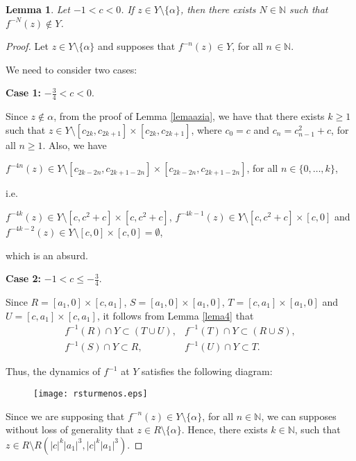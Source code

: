 \documentclass[11pt]{amsart}
\newtheorem{lemma}[theorem]{Lemma}
\theoremstyle{definition}
\begin{document}
\begin{lemma}
Let $-1< c<0$. If $z\in Y\setminus \{\alpha\}$, then there exists $N\in\mathbb{N}$ such that $f^{-N}(z)\not\in Y$. \label{propmula}
\end{lemma}
\begin{proof} Let $z\in Y\setminus\{\alpha\}$ and supposes that $f^{-n}(z)\in
	Y$, for all $n\in\mathbb{N}$.
	
	We need to consider two cases:
	
	\textbf{Case 1:} $-\frac{3}{4}<c<0$.
	
Since $z\notin\alpha$, from the proof of Lemma \ref{lemaazia}, we have that there exists $k\geq 1$ such that $z\in Y\setminus [c_{2k},c_{2k+1}]\times[c_{2k},c_{2k+1}]$, where $c_0=c$ and $c_n=c_{n-1}^2+c$, for all $n\geq 1$. Also, we have
	\begin{center}
		$f^{-4n}(z)\in Y\setminus [c_{2k-2n},c_{2k+1-2n}]\times[c_{2k-2n},c_{2k+1-2n}]$, for all $n\in\{0,\ldots,k\}$,
	\end{center}
	i.e. 
	\begin{center}
		$f^{-4k}(z)\in Y\setminus [c,c^2+c]\times [c,c^2+c]$, $f^{-4k-1}(z)\in Y\setminus [c,c^2+c]\times [c,0]$ and \\
		$f^{-4k-2}(z)\in Y\setminus [c,0]\times [c,0]=\emptyset$,
	\end{center} 
	which is an absurd.
	
	\textbf{Case 2:} $-1<c\leq -\frac{3}{4}$.
	
	Since $R=[a_1,0]\times[c,a_1]$, $S=[a_1,0]\times[a_1,0]$,
	$T=[c,a_1]\times[a_1,0]$ and $U=[c,a_1]\times[c,a_1]$, it follows from Lemma
	\ref{lema4} that
	$$
	\begin{array}{ll}
	f^{-1}(R)\cap Y\subset (T\cup U), & f^{-1}(T)\cap Y\subset (R\cup S),  \\
	f^{-1}(S)\cap Y\subset R,  &	f^{-1}(U)\cap Y\subset T.
	\end{array}
	$$
	
	Thus, the dynamics of $f^{-1}$ at $Y$ satisfies the following diagram:
	\begin{figure}[!h]
	\centering
	\texttt{[image: rsturmenos.eps]}
\end{figure}
	
	Since we are supposing that $f^{-n}(z)\in Y\setminus\{\alpha\}$, for all $n\in\mathbb{N}$, we can supposes without loss of generality that $z\in R\setminus
	\{\alpha\}$. Hence, there exists $k\in\mathbb{N}$, such that $z\in
	R\setminus R(|c|^k|a_1|^3,|c|^k|a_1|^3)$.
	

\end{proof}
\end{document}
